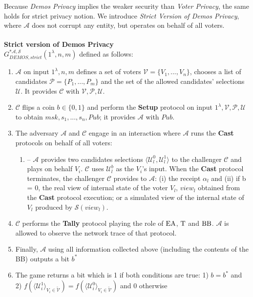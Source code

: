 Because \textit{Demos Privacy} implies the weaker security than \textit{Voter Privacy}, the same holds for strict privacy notion. We introduce \textit{Strict Version of Demos Privacy}, where $\mathcal{A}$ does not corrupt any entity, but operates on behalf of all voters. \\\\
 \textbf{Strict version of Demos Privacy}\\
 $G_{DEMOS,strict}^{*\mathcal{A}, \mathcal{S}}(1^{\lambda},n,m)$ defined as follows:\\
\begin{enumerate}
\item $\mathcal{A}$ on input $1^{\lambda},n,m$ defines a set of voters  $\mathcal{V} = \{V_1,...,V_n\}$, chooses a list of candidates  $\mathcal{P} = \{P_1,...,P_m\}$ and the set of the allowed candidates' selections $\mathcal{U}$.  It provides $\mathcal{C}$ with $\mathcal{V}, \mathcal{P}, \mathcal{U}$.
\item $\mathcal{C}$ flips a coin $b\in \{0,1\}$ and perform the \textbf{Setup} protocol on input $1^{\lambda},\mathcal{V}, \mathcal{P}, \mathcal{U}$ to obtain $msk,s_1,...,s_n, Pub$; it provides  $\mathcal{A}$ with $Pub$. 
\item The adversary $\mathcal{A}$  and $\mathcal{C}$ engage in an interaction where $\mathcal{A}$ runs the \textbf{Cast} protocols on behalf of all voters:
\begin{enumerate}
\item[] --  $\mathcal{A}$ provides two candidates selections $\langle \mathcal{U}^0_l , \mathcal{U}^1_l \rangle$ to the challenger $\mathcal{C}$ and plays on behalf $V_i$. $\mathcal{C}$ uses $\mathcal{U}^b_l$ as the $V_i$'s input. When the  \textbf{Cast} protocol terminates, the challenger  $\mathcal{C}$ provides to $\mathcal{A}$: (i) the receipt $\alpha_l$ and (ii) if b = 0, the real view of internal state of the voter $V_l$, $view_l$ obtained from the \textbf{Cast} protocol execution; or  a simulated view of the internal state of $V_l$ produced by $\mathcal{S}(view_l)$.
\end{enumerate}
\item $\mathcal{C}$ performs the  \textbf{Tally} protocol playing the role of $\operatorname{EA}$, $\operatorname{T}$  and $\operatorname{BB}$. $\mathcal{A}$ is allowed to observe the network trace of that protocol. 
\item Finally, $\mathcal{A}$ using all information collected above (including the contents of the BB) outputs a bit $b^*$
\item  The game returns a bit which is 1 if both conditions are true: 1) $b = b^*$ and 2) $f(\langle \mathcal{U}^1_i \rangle _{V_i \in \tilde{\mathcal{V}}} ) =  f(\langle \mathcal{U}^0_i \rangle _{V_i \in \tilde{\mathcal{V}}} )$ and 0 otherwise
\end{enumerate}
